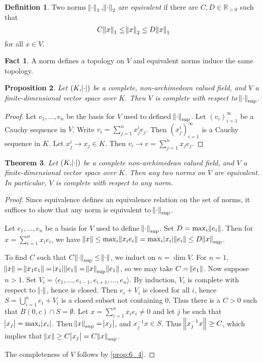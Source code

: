 \documentclass[11pt]{article}
\theoremstyle{definition}
\newtheorem{definition}{Definition}[subsection]
\newtheorem*{fact}{Fact}
\theoremstyle{plain}
\newtheorem{theorem}[definition]{Theorem}
\newtheorem{proposition}[definition]{Proposition}
\theoremstyle{remark}
\newcommand{\bR}{\mathbb{R}}
\begin{document}
\begin{definition}
    Two norms $\norm{\cdot}_1, \norm{\cdot}_2$ are \emph{equivalent} if there are $C, D \in \bR_{>0}$ such that
    \begin{equation*}
        C \norm{x}_1 \le \norm{x}_2 \le D \norm{x}_1
    \end{equation*}
    for all $x \in V$.
\end{definition}
\begin{fact}
    A norm defines a topology on $V$ and equivalent norms induce the same topology.
\end{fact}

\begin{proposition}\label{prop:6_4}
    Let $(K, \abs{\cdot})$ be a complete, non-archimedean valued field, and $V$ a finite-dimensional vector space over $K$. Then $V$ is complete with respect to $\norm{\cdot}_\mathrm{sup}$.
\end{proposition}
\begin{proof}
    Let $e_1, \ldots, e_n$ be the basis for $V$ used to defined $\norm{\cdot}_\mathrm{sup}$. Let $(v_i)_{i=1}^\infty$ be a Cauchy sequence in $V$. Write $v_i = \sum_{j=1}^n x_j^i e_j$. Then $(x_j^i)_{i=1}^\infty$ is a Cauchy sequence in $K$. Let $x_j^i \to x_j \in K$. Then $v_i \to v = \sum_{j=1}^n x_j e_j$.
\end{proof}

\begin{theorem}\label{thm:6_5}
    Let $(K, \abs{\cdot})$ be a complete non-archimedean valued field, and $V$ a finite-dimensional vector space over $K$. Then any two norms on $V$ are equivalent. In particular, $V$ is complete with respect to any norm.
\end{theorem}
\begin{proof}
    Since equivalence defines an equivalence relation on the set of norms, it suffices to show that any norm is equivalent to $\norm{\cdot}_\mathrm{sup}$.

    Let $e_1, \ldots, e_n$ be a basis for $V$ used to define $\norm{\cdot}_\mathrm{sup}$. Set $D = \max_i \norm{e_i}$. Then for $x = \sum_{i=1}^n x_i e_i$, we have $\norm{x} \le \max_i \norm{x_i e_i} = \max_i \abs{x_i} \norm{e_i} \le D \norm{x}_\mathrm{sup}$.

    To find $C$ such that $C \norm{\cdot}_\mathrm{sup} \le \norm{\cdot}$, we induct on $n = \dim{V}$. For $n = 1$, $\norm{x} = \norm{x_1 e_1} = \abs{x_1}\norm{e_1} = \norm{x}_\mathrm{sup} \norm{e_1}$, so we may take $C = \norm{e_1}$. Now suppose $n > 1$. Set $V_i = \langle e_1, \ldots, e_{i-1}, e_{i+1}, \ldots, e_n \rangle$. By induction, $V_i$ is complete with respect to $\norm{\cdot}$, hence is closed. Then $e_i + V_i$ is closed for all $i$, hence $S = \bigcup_{i=1}^n e_i + V_i$ is a closed subset not containing $0$. Thus there is a $C > 0$ such that $B(0, c) \cap S = \emptyset$. Let $x = \sum_{i=1}^n x_i e_i \neq 0$ and let $j$ be such that $\abs{x_j} = \max_i \abs{x_i}$. Then $\norm{x}_\mathrm{sup} = \abs{x_j}$, and $x_j^{-1} x \in S$. Thus $\norm{x_j^{-1} x} \ge C$, which implies that $\norm{x} \ge C \abs{x_j} = C \norm{x}_\mathrm{sup}$.

    The completeness of $V$ follows by \autoref{prop:6_4}.
\end{proof}
\end{document}
